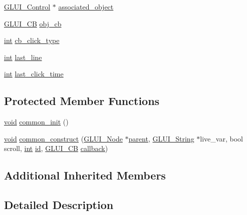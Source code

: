 \begin{DoxyCompactItemize}
\item 
\hyperlink{class_g_l_u_i___control}{G\+L\+U\+I\+\_\+\+Control} $\ast$ \hyperlink{class_g_l_u_i___list_a1c3da23655fb3019ecf7836782c6a0c6}{associated\+\_\+object}
\item 
\hyperlink{class_g_l_u_i___c_b}{G\+L\+U\+I\+\_\+\+C\+B} \hyperlink{class_g_l_u_i___list_ada809121f5b61c3ec100ef2b2cc87a3e}{obj\+\_\+cb}
\item 
\hyperlink{wglext_8h_a500a82aecba06f4550f6849b8099ca21}{int} \hyperlink{class_g_l_u_i___list_a10035be2d469c11e4009e77540bdf080}{cb\+\_\+click\+\_\+type}
\item 
\hyperlink{wglext_8h_a500a82aecba06f4550f6849b8099ca21}{int} \hyperlink{class_g_l_u_i___list_a500f3a7a615367a44088d69c8e537ba6}{last\+\_\+line}
\item 
\hyperlink{wglext_8h_a500a82aecba06f4550f6849b8099ca21}{int} \hyperlink{class_g_l_u_i___list_af90d2646dbb12f1dbe1bfd9e8891fc37}{last\+\_\+click\+\_\+time}
\end{DoxyCompactItemize}
\subsection*{Protected Member Functions}
\begin{DoxyCompactItemize}
\item 
\hyperlink{wglext_8h_a9e6b7f1933461ef318bb000d6bd13b83}{void} \hyperlink{class_g_l_u_i___list_a2693fbb3bd3dd6bb051ca1f02d4a017c}{common\+\_\+init} ()
\item 
\hyperlink{wglext_8h_a9e6b7f1933461ef318bb000d6bd13b83}{void} \hyperlink{class_g_l_u_i___list_abe3d92ffe3c2795adb4b0b2bec3a390a}{common\+\_\+construct} (\hyperlink{class_g_l_u_i___node}{G\+L\+U\+I\+\_\+\+Node} $\ast$\hyperlink{class_g_l_u_i___node_a8ed65d447784f6f88bd3e2e2bcac6cdb}{parent}, \hyperlink{glui_8h_aada824856f7bcf29794719981ebd8f60}{G\+L\+U\+I\+\_\+\+String} $\ast$live\+\_\+var, bool scroll, \hyperlink{wglext_8h_a500a82aecba06f4550f6849b8099ca21}{int} \hyperlink{glext_8h_a58c2a664503e14ffb8f21012aabff3e9}{id}, \hyperlink{class_g_l_u_i___c_b}{G\+L\+U\+I\+\_\+\+C\+B} \hyperlink{class_g_l_u_i___control_a96060fe0cc6d537e736dd6eef78e24ab}{callback})
\end{DoxyCompactItemize}
\subsection*{Additional Inherited Members}


\subsection{Detailed Description}


